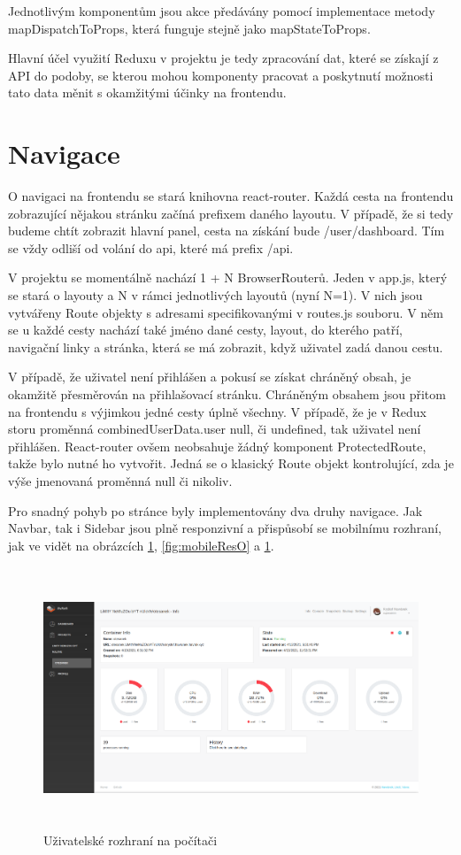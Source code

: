 \documentclass[a4paper,oneside,12pt]{report}
\begin{document}
Jednotlivým komponentům jsou akce předávány pomocí implementace metody mapDispatchToProps, která funguje stejně jako mapStateToProps.

Hlavní účel využití Reduxu v projektu je tedy zpracování dat, které se získají z API do podoby, se kterou mohou komponenty pracovat a poskytnutí možnosti tato data měnit s okamžitými účinky na frontendu.


\section{Navigace}

O navigaci na frontendu se stará knihovna react-router.
Každá cesta na frontendu zobrazující nějakou stránku začíná prefixem daného layoutu.
V případě, že si tedy budeme chtít zobrazit hlavní panel, cesta na získání bude /user/dashboard.
Tím se vždy odliší od volání do api, které má prefix /api.

V projektu se momentálně nachází 1 + N BrowserRouterů.
Jeden v app.js, který se stará o layouty a N v rámci jednotlivých layoutů (nyní N=1).
V nich jsou vytvářeny Route objekty s adresami specifikovanými v routes.js souboru.
V něm se u každé cesty nachází také jméno dané cesty, layout, do kterého patří, navigační linky a stránka, která se má zobrazit, když uživatel zadá danou cestu.

V případě, že uživatel není přihlášen a pokusí se získat chráněný obsah, je okamžitě přesměrován na přihlašovací stránku.
Chráněným obsahem jsou přitom na frontendu s výjimkou jedné cesty úplně všechny.
V případě, že je v Redux storu proměnná combinedUserData.user null, či undefined, tak uživatel není přihlášen.
React-router ovšem neobsahuje žádný komponent ProtectedRoute, takže bylo nutné ho vytvořit.
Jedná se o klasický Route objekt kontrolující, zda je výše jmenovaná proměnná null či nikoliv.

Pro snadný pohyb po stránce byly implementovány dva druhy navigace.
Jak Navbar, tak i Sidebar jsou plně responzivní a přispůsobí se mobilnímu rozhraní, jak ve vidět na obrázcích \ref{fig:desktopRes},  \ref{fig:mobileResO} a \ref{fig:desktopRes}.

\begin{figure}[h]
	\centering
	\includegraphics[height=7.8cm]{../img/navbarNonResponsive.png}
	\caption[Uživatelské rozhraní na počítači, vlastní tvorba]{Uživatelské rozhraní na počítači \linebreak}
	\label{fig:desktopRes}
\end{figure}
\end{document}
